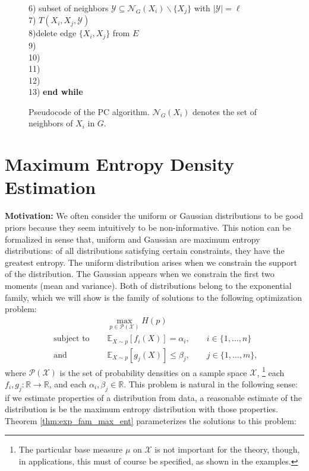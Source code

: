\documentclass[twoside]{article}
\newcommand\E{\mathbb{E}}       %
\newcommand\Pds{\mathcal{P}}
\newcommand\R{\mathbb{R}}
\newcommand\X{\mathcal{X}}
\newcommand\Y{\mathcal{Y}}
\newcommand\sminus{\backslash}
\newcommand\nbr{\mathcal{N}}
\begin{document}
\begin{figure}
\begin{tabbing}
6)\>\> subset of neighbors
            $\Y \subseteq \nbr_G(X_i) \sminus \{X_j\}$ with $|\Y| = \ell$   \\
7)\>\>\> $T(X_i,X_j,\Y)$    \\
8)\>\>\>\>\>delete edge $\{X_i,X_j\}$ from $E$  \\
9)\>\>\>\>   \\
10)\>\>\> \\
11)\>\> \\
12)\> \\
13)\> {\bf end while}
\end{tabbing}
\caption{Pseudocode of the PC algorithm. $\nbr_G(X_i)$ denotes the set of
neighbors of $X_i$ in $G$.}
\label{fig:PC_algo}
\end{figure}

\section{Maximum Entropy Density Estimation}
{\bf Motivation:}
We often consider the uniform or Gaussian distributions to be good priors
because they seem intuitively to be non-informative. This notion can be
formalized in sense that, uniform and Gaussian are maximum entropy
distributions: of all distributions satisfying certain constraints, they have
the greatest entropy. The uniform distribution arises when we constrain the
support of the distribution. The Gaussian appears when we constrain the first
two moments (mean and variance). Both of distributions belong to the
exponential family, which we will show is the family of solutions to the
following optimization problem:
\begin{align}
\label{opt_prob}
                            & \max_{p \in \Pds(\X)} H(p)                \\
\nonumber
\mbox{ subject to } \quad   & \E_{X \sim p}[f_i(X)] = \alpha_i,
                                            \qquad i \in \{1,\dots,n\}  \\
\nonumber
\mbox{ and } \quad          & \E_{X \sim p}[g_j(X)] \leq \beta_j,
                                            \qquad j \in \{1,\dots,m\},
\end{align}
where $\Pds(\X)$ is the set of probability densities on a sample space $\X$,
\footnote{The particular base measure $\mu$ on $\X$ is not important for the
theory, though, in applications, this must of course be specified, as shown in
the examples.}
each $f_i,g_j : \R \to \R$, and each $\alpha_i,\beta_j \in \R$.
This problem is natural in the following sense: if we estimate properties of a
distribution from data, a reasonable estimate of the distribution is be the
maximum entropy distribution with those properties. Theorem
\ref{thm:exp_fam_max_ent} parameterizes the solutions to this problem:
\end{document}
